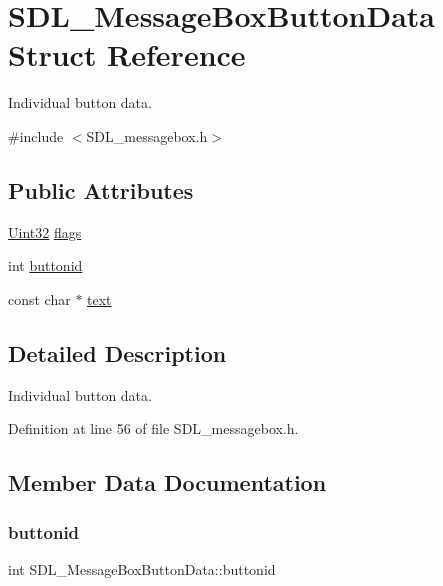 \hypertarget{struct_s_d_l___message_box_button_data}{}\section{S\+D\+L\+\_\+\+Message\+Box\+Button\+Data Struct Reference}
\label{struct_s_d_l___message_box_button_data}


Individual button data.  




{\ttfamily \#include $<$S\+D\+L\+\_\+messagebox.\+h$>$}

\subsection*{Public Attributes}
\begin{DoxyCompactItemize}
\item 
\mbox{\hyperlink{_s_d_l__stdinc_8h_add440eff171ea5f55cb00c4a9ab8672d}{Uint32}} \mbox{\hyperlink{struct_s_d_l___message_box_button_data_a426c8b5da0e718242c7840706d95de0b}{flags}}
\item 
int \mbox{\hyperlink{struct_s_d_l___message_box_button_data_a22938886a6b13792006cc5c91fa38e92}{buttonid}}
\item 
const char $\ast$ \mbox{\hyperlink{struct_s_d_l___message_box_button_data_af35f3062f0577159284c8828caaf08e4}{text}}
\end{DoxyCompactItemize}


\subsection{Detailed Description}
Individual button data. 

Definition at line 56 of file S\+D\+L\+\_\+messagebox.\+h.



\subsection{Member Data Documentation}
\mbox{\label{struct_s_d_l___message_box_button_data_a22938886a6b13792006cc5c91fa38e92}} 
\subsubsection{\texorpdfstring{buttonid}{buttonid}}
{\footnotesize\ttfamily int S\+D\+L\+\_\+\+Message\+Box\+Button\+Data\+::buttonid}

